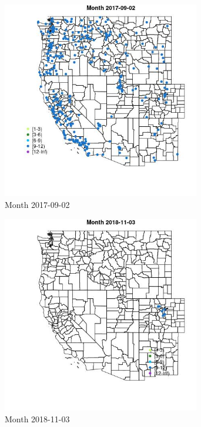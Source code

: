 \begin{figure} 
\centering  
\includegraphics[width=0.77\textwidth]{Code_Outputs/Report_ML_input_PM25_Step4_part_e_de_duplicated_aveswNAs_MapObsMonth2017-09-02.jpg} 
\caption{\label{fig:Report_ML_input_PM25_Step4_part_e_de_duplicated_aveswNAsMapObsMonth2017-09-02}Month 2017-09-02} 
\end{figure} 
 

\clearpage 

\begin{figure} 
\centering  
\includegraphics[width=0.77\textwidth]{Code_Outputs/Report_ML_input_PM25_Step4_part_e_de_duplicated_aveswNAs_MapObsMonth2018-11-03.jpg} 
\caption{\label{fig:Report_ML_input_PM25_Step4_part_e_de_duplicated_aveswNAsMapObsMonth2018-11-03}Month 2018-11-03} 
\end{figure} 
 

